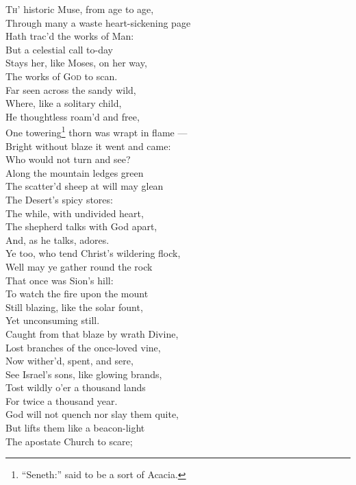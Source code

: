 \textsc{Th’} historic Muse, from age to age, \\
 Through many a waste heart-sickening page \\
 Hath trac’d the works of Man: \\
 But a celestial call to-day \\
 Stays her, like Moses, on her way, \\
 The works of \textsc{God} to scan. \\
  Far seen across the sandy wild, \\
 Where, like a solitary child, \\
 He thoughtless roam’d and free, \\
 One towering\footnote{“Seneth:” said to be a sort of Acacia.} thorn was wrapt in flame — \\
 Bright without blaze it went and came: \\
 Who would not turn and see? \\
  Along the mountain ledges green \\
 The scatter’d sheep at will may glean \\
 The Desert’s spicy stores: \\
 The while, with undivided heart, \\
 The shepherd talks with God apart, \\
 And, as he talks, adores. \\
  Ye too, who tend Christ’s wildering flock, \\
 Well may ye gather round the rock \\
 That once was Sion’s hill: \\
 To watch the fire upon the mount \\
 Still blazing, like the solar fount, \\
 Yet unconsuming still. \\
  Caught from that blaze by wrath Divine, \\
 Lost branches of the once-loved vine, \\
 Now wither’d, spent, and sere, \\
 See Israel’s sons, like glowing brands, \\
 Tost wildly o’er a thousand lands \\
 For twice a thousand year. \\
  God will not quench nor slay them quite, \\
 But lifts them like a beacon-light \\
 The apostate Church to scare; \\
